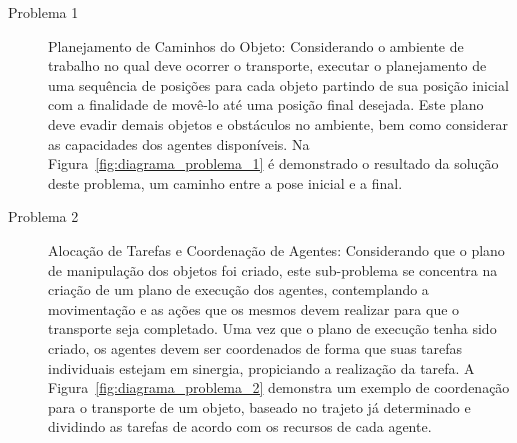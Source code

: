 \begin{description}

	\item[Problema 1] Planejamento de Caminhos do Objeto: Considerando o ambiente de trabalho no qual deve ocorrer o transporte, executar o planejamento de uma sequência de posições para cada objeto partindo de sua posição inicial com a finalidade de movê-lo até uma posição final desejada.
	Este plano deve evadir demais objetos e obstáculos no ambiente, bem como considerar as capacidades dos agentes disponíveis.
	Na Figura~\ref{fig:diagrama_problema_1} é demonstrado o resultado da solução deste problema, um caminho entre a pose inicial e a final.


	\item[Problema 2] Alocação de Tarefas e Coordenação de Agentes: Considerando que o plano de manipulação dos objetos foi criado, este sub-problema se concentra na criação de um plano de execução dos agentes, contemplando a movimentação e as ações que os mesmos devem realizar para que o transporte seja completado.
	Uma vez que o plano de execução tenha sido criado, os agentes devem ser coordenados de forma que suas tarefas individuais estejam em sinergia, propiciando a realização da tarefa.
	A Figura~\ref{fig:diagrama_problema_2} demonstra um exemplo de coordenação para o transporte de um objeto, baseado no trajeto já determinado e dividindo as tarefas de acordo com os recursos de cada agente.

\end{description}

